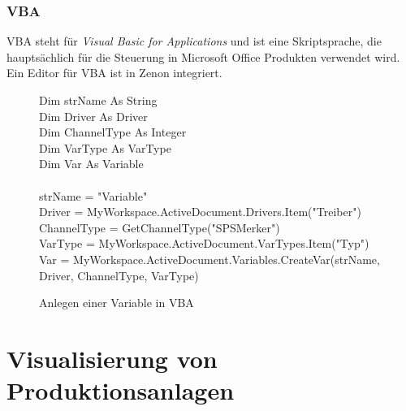 \subsubsection{VBA}
VBA steht für \textit{Visual Basic for Applications} und ist eine Skriptsprache, die hauptsächlich für die Steuerung in Microsoft Office Produkten verwendet wird.
Ein Editor für VBA ist in Zenon integriert.

\begin{figure}[h!]
	\begin{framed}
		\color{black}
		Dim strName As String\\
		Dim Driver As Driver\\
		Dim ChannelType As Integer\\
		Dim VarType As VarType\\
		Dim Var As Variable\\
		\\
		strName = "Variable"\\
		Driver = MyWorkspace.ActiveDocument.Drivers.Item("Treiber")\\
		ChannelType = GetChannelType("SPSMerker")\\
		VarType = MyWorkspace.ActiveDocument.VarTypes.Item("Typ")\\
		Var = MyWorkspace.ActiveDocument.Variables.CreateVar(strName, Driver, ChannelType, VarType)
	\end{framed}
	\caption{Anlegen einer Variable in VBA}
\end{figure}


\section{Visualisierung von Produktionsanlagen}
